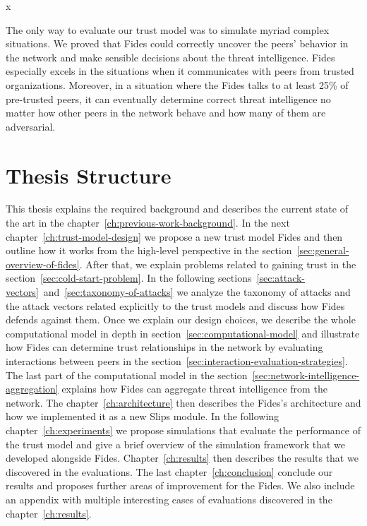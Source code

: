 x

The only way to evaluate our trust model was to simulate myriad complex situations. We proved that Fides could correctly uncover the peers' behavior in the network and make sensible decisions about the threat intelligence. 
Fides especially excels in the situations when it communicates with peers from trusted organizations.
Moreover, in a situation where the Fides talks to at least 25\% of pre-trusted peers, it can eventually determine correct threat intelligence no matter how other peers in the network behave and how many of them are adversarial.

\section{Thesis Structure}
\label{sec:thesis-structure}
This thesis explains the required background and describes the current state of the art in the chapter~\ref{ch:previous-work-background}.
In the next chapter~\ref{ch:trust-model-design} we propose a new trust model Fides and then outline how it works from the high-level perspective in the section~\ref{sec:general-overview-of-fides}.
After that, we explain problems related to gaining trust in the section~\ref{sec:cold-start-problem}.
In the following sections~\ref{sec:attack-vectors}~and~\ref{sec:taxonomy-of-attacks} we analyze the taxonomy of attacks and the attack vectors related explicitly to the trust models and discuss how Fides defends against them.
Once we explain our design choices, we describe the whole computational model in depth in section~\ref{sec:computational-model} and illustrate how Fides can determine trust relationships in the network by evaluating interactions between peers in the section~\ref{sec:interaction-evaluation-strategies}.
The last part of the computational model in the section~\ref{sec:network-intelligence-aggregation} explains how Fides can aggregate threat intelligence from the network.
The chapter~\ref{ch:architecture} then describes the Fides's architecture and how we implemented it as a new Slips module.
In the following chapter~\ref{ch:experiments} we propose simulations that evaluate the performance of the trust model and give a brief overview of the simulation framework that we developed alongside Fides.
Chapter~\ref{ch:results} then describes the results that we discovered in the evaluations. The last chapter~\ref{ch:conclusion} conclude our results and proposes further areas of improvement for the Fides. 
We also include an appendix with multiple interesting cases of evaluations discovered in the chapter~\ref{ch:results}.

